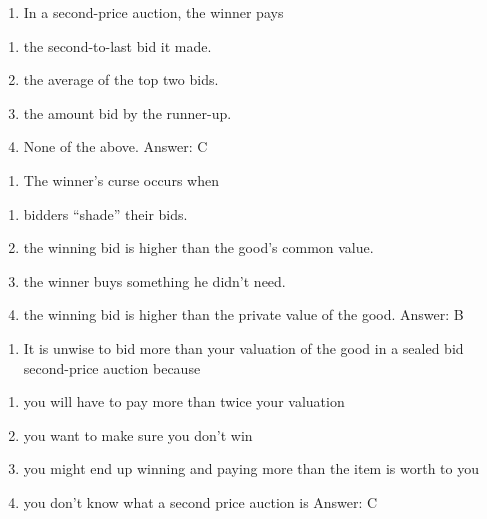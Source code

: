 \documentclass[11pt,]{article}
\providecommand{\tightlist}{%
  \setlength{\itemsep}{0pt}\setlength{\parskip}{0pt}}
\begin{document}
\begin{enumerate}
\def\labelenumi{\arabic{enumi})}
\setcounter{enumi}{20}
\tightlist
\item
  In a second-price auction, the winner pays
\end{enumerate}

\begin{enumerate}
\def\labelenumi{\Alph{enumi})}
\tightlist
\item
  the second-to-last bid it made.
\item
  the average of the top two bids.
\item
  the amount bid by the runner-up.
\item
  None of the above. Answer: C
\end{enumerate}

\begin{enumerate}
\def\labelenumi{\arabic{enumi})}
\setcounter{enumi}{21}
\tightlist
\item
  The winner's curse occurs when
\end{enumerate}

\begin{enumerate}
\def\labelenumi{\Alph{enumi})}
\tightlist
\item
  bidders ``shade'' their bids.
\item
  the winning bid is higher than the good's common value.
\item
  the winner buys something he didn't need.
\item
  the winning bid is higher than the private value of the good. Answer:
  B
\end{enumerate}

\begin{enumerate}
\def\labelenumi{\arabic{enumi})}
\setcounter{enumi}{22}
\tightlist
\item
  It is unwise to bid more than your valuation of the good in a sealed
  bid second-price auction because
\end{enumerate}

\begin{enumerate}
\def\labelenumi{\Alph{enumi})}
\tightlist
\item
  you will have to pay more than twice your valuation
\item
  you want to make sure you don't win
\item
  you might end up winning and paying more than the item is worth to you
\item
  you don't know what a second price auction is Answer: C
\end{enumerate}
\end{document}
